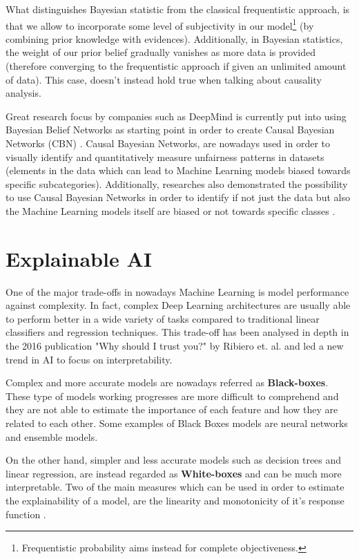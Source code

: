 What distinguishes Bayesian statistic from the classical frequentistic approach, is that we allow to incorporate some level of subjectivity in our model\footnote{Frequentistic probability aims instead for complete objectiveness.} (by combining prior knowledge with evidences). Additionally, in Bayesian statistics, the weight of our prior belief gradually vanishes as more data is provided (therefore converging to the frequentistic approach if given an unlimited amount of data). This case, doesn't instead hold true when talking about causality analysis.

Great research focus by companies such as DeepMind is currently put into using Bayesian Belief Networks as starting point in order to create Causal Bayesian Networks (CBN) \cite{deep}. Causal Bayesian Networks, are nowadays used in order to visually identify and quantitatively measure unfairness patterns in datasets (elements in the data which can lead to Machine Learning models biased towards specific subcategories). Additionally, researches also demonstrated the possibility to use Causal Bayesian Networks in order to identify if not just the data but also the Machine Learning models itself are biased or not towards specific classes \cite{deep2}.

\section{Explainable AI}
One of the major trade-offs in nowadays Machine Learning is model performance against complexity. In fact, complex Deep Learning architectures are usually able to perform better in a wide variety of tasks compared to traditional linear classifiers and regression techniques. This trade-off has been analysed in depth in the 2016 publication "Why should I trust you?" by Ribiero et. al. \cite{xai} and led a new trend in AI to focus on interpretability.

Complex and more accurate models are nowadays referred as \textbf{Black-boxes}. These type of models working progresses are more difficult to comprehend and they are not able to estimate the importance of each feature and how they are related to each other. Some examples of Black Boxes models are neural networks and ensemble models.

On the other hand, simpler and less accurate models such as decision trees and linear regression, are instead regarded as \textbf{White-boxes} and can be much more interpretable. Two of the main measures which can be used in order to estimate the explainability of a model, are the linearity and monotonicity of it's response function \cite{lars}.

